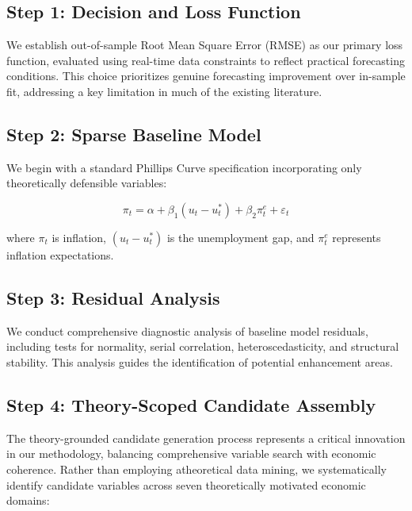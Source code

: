 \documentclass[12pt]{article}
\begin{document}
\subsection{Step 1: Decision and Loss Function}

We establish out-of-sample Root Mean Square Error (RMSE) as our primary loss function, evaluated using real-time data constraints to reflect practical forecasting conditions. This choice prioritizes genuine forecasting improvement over in-sample fit, addressing a key limitation in much of the existing literature.

\subsection{Step 2: Sparse Baseline Model}

We begin with a standard Phillips Curve specification incorporating only theoretically defensible variables:

\begin{equation}
\pi_t = \alpha + \beta_1 (u_t - u_t^*) + \beta_2 \pi_t^e + \varepsilon_t
\end{equation}

where $\pi_t$ is inflation, $(u_t - u_t^*)$ is the unemployment gap, and $\pi_t^e$ represents inflation expectations.

\subsection{Step 3: Residual Analysis}

We conduct comprehensive diagnostic analysis of baseline model residuals, including tests for normality, serial correlation, heteroscedasticity, and structural stability. This analysis guides the identification of potential enhancement areas.

\subsection{Step 4: Theory-Scoped Candidate Assembly}

The theory-grounded candidate generation process represents a critical innovation in our methodology, balancing comprehensive variable search with economic coherence. Rather than employing atheoretical data mining, we systematically identify candidate variables across seven theoretically motivated economic domains:
\end{document}
